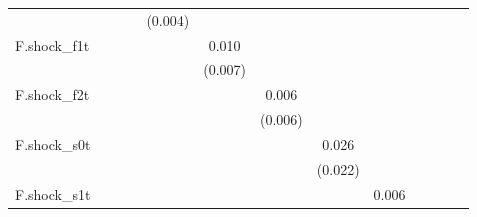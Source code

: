 {\begin{tabular}{l*{12}{c}}
            &                     &                     &                     &     (0.004)         &                     &                     &                     &                     &                     &                     &                     &                     \\
\addlinespace
F.shock\_f1t &                     &                     &                     &                     &       0.010         &                     &                     &                     &                     &                     &                     &                     \\
            &                     &                     &                     &                     &     (0.007)         &                     &                     &                     &                     &                     &                     &                     \\
\addlinespace
F.shock\_f2t &                     &                     &                     &                     &                     &       0.006         &                     &                     &                     &                     &                     &                     \\
            &                     &                     &                     &                     &                     &     (0.006)         &                     &                     &                     &                     &                     &                     \\
\addlinespace
F.shock\_s0t &                     &                     &                     &                     &                     &                     &       0.026         &                     &                     &                     &                     &                     \\
            &                     &                     &                     &                     &                     &                     &     (0.022)         &                     &                     &                     &                     &                     \\
\addlinespace
F.shock\_s1t &                     &                     &                     &                     &                     &                     &                     &       0.006         &                     &                     &                     &                     \\

\end{tabular}}
